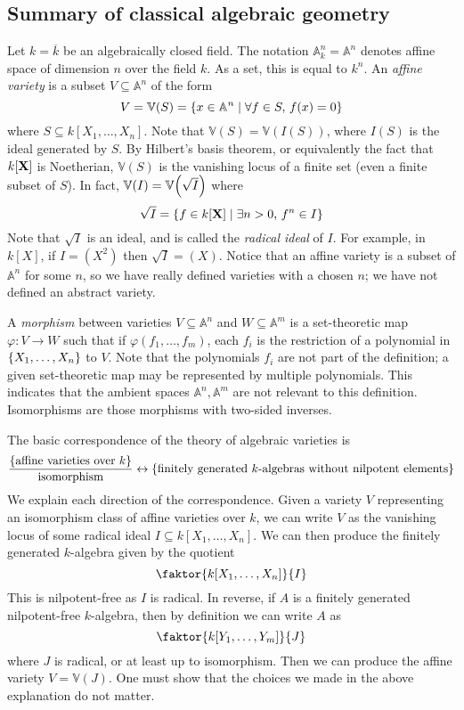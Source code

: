 \subsection{Summary of classical algebraic geometry}
Let \( k = \overline k \) be an algebraically closed field.
The notation \( \mathbb A^n_k = \mathbb A^n \) denotes affine space of dimension \( n \) over the field \( k \).
As a set, this is equal to \( k^n \).
An \emph{affine variety} is a subset \( V \subseteq \mathbb A^n \) of the form
\[ V = \mathbb V(S) = \qty{x \in \mathbb A^n \mid \forall f \in S,\, f(x) = 0} \]
where \( S \subseteq k[X_1, \dots, X_n] \).
Note that \( \mathbb V(S) = \mathbb V(I(S)) \), where \( I(S) \) is the ideal generated by \( S \).
By Hilbert's basis theorem, or equivalently the fact that \( k[\vb X] \) is Noetherian, \( \mathbb V(S) \) is the vanishing locus of a finite set (even a finite subset of \( S \)).
In fact, \( \mathbb V(I) = \mathbb V\qty(\sqrt{I}) \) where
\[ \sqrt{I} = \qty{f \in k[\vb X] \mid \exists n > 0,\, f^n \in I} \]
Note that \( \sqrt{I} \) is an ideal, and is called the \emph{radical ideal} of \( I \).
For example, in \( k[X] \), if \( I = (X^2) \) then \( \sqrt{I} = (X) \).
Notice that an affine variety is a subset of \( \mathbb A^n \) for some \( n \), so we have really defined varieties with a chosen \( n \); we have not defined an abstract variety.

A \emph{morphism} between varieties \( V \subseteq \mathbb A^n \) and \( W \subseteq \mathbb A^m \) is a set-theoretic map \( \varphi : V \to W \) such that if \( \varphi(f_1, \dots, f_m) \), each \( f_i \) is the restriction of a polynomial in \( \qty{X_1, \dots, X_n} \) to \( V \).
Note that the polynomials \( f_i \) are not part of the definition; a given set-theoretic map may be represented by multiple polynomials.
This indicates that the ambient spaces \( \mathbb A^n, \mathbb A^m \) are not relevant to this definition.
Isomorphisms are those morphisms with two-sided inverses.

The basic correspondence of the theory of algebraic varieties is
\[ \frac{\qty{\text{affine varieties over } k}}{\text{isomorphism}} \leftrightarrow \qty{\text{finitely generated \( k \)-algebras without nilpotent elements}} \]
We explain each direction of the correspondence.
Given a variety \( V \) representing an isomorphism class of affine varieties over \( k \), we can write \( V \) as the vanishing locus of some radical ideal \( I \subseteq k[X_1, \dots, X_n] \).
We can then produce the finitely generated \( k \)-algebra given by the quotient
\[ \faktor{k[X_1, \dots, X_n]}{I} \]
This is nilpotent-free as \( I \) is radical.
In reverse, if \( A \) is a finitely generated nilpotent-free \( k \)-algebra, then by definition we can write \( A \) as
\[ \faktor{k[Y_1, \dots, Y_m]}{J} \]
where \( J \) is radical, or at least up to isomorphism.
Then we can produce the affine variety \( V = \mathbb V(J) \).
One must show that the choices we made in the above explanation do not matter.

